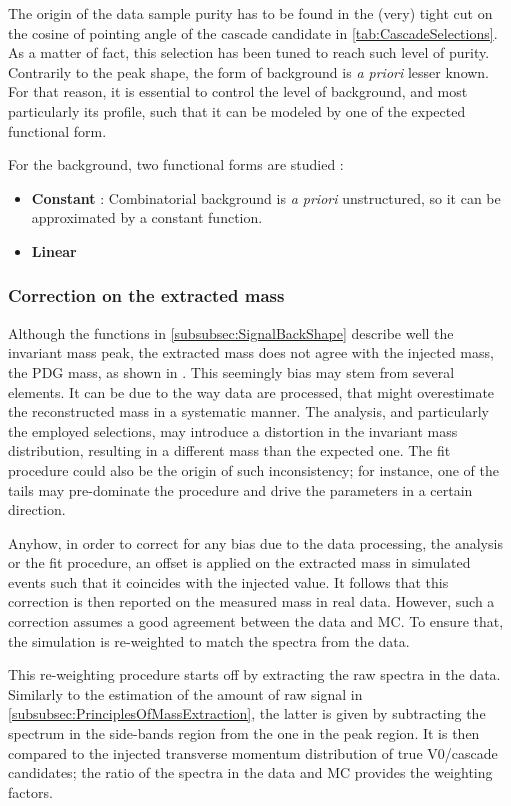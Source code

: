 The origin of the data sample purity has to be found in the (very) tight cut on the cosine of pointing angle of the cascade candidate in \tab\ref{tab:CascadeSelections}. As a matter of fact, this selection has been tuned to reach such level of purity. Contrarily to the peak shape, the form of background is \textit{a priori} lesser known. For that reason, it is essential to control the level of background, and most particularly its profile, such that it can be modeled by one of the expected functional form.


For the background, two functional forms are studied :

\begin{itemize}
\item \textbf{Constant} : Combinatorial background is \textit{a priori} unstructured, so it can be approximated by a constant function.
\item \textbf{Linear} 
\end{itemize}

\subsubsection{Correction on the extracted mass}

Although the functions in \Sec\ref{subsubsec:SignalBackShape} describe well the invariant mass peak, the extracted mass does not agree with the injected mass, the PDG mass, as shown in \fig. This seemingly bias may stem from several elements. It can be due to the way data are processed, that might overestimate the reconstructed mass in a systematic manner. The analysis, and particularly the employed selections, may introduce a distortion in the invariant mass distribution, resulting in a different mass than the expected one. The fit procedure could also be the origin of such inconsistency; for instance, one of the tails may pre-dominate the procedure and drive the parameters in a certain direction.

Anyhow, in order to correct for any bias due to the data processing, the analysis or the fit procedure, an offset is applied on the extracted mass in simulated events such that it coincides with the injected value. It follows that this correction is then reported on the measured mass in real data. However, such a correction assumes a good agreement between the data and MC. To ensure that, the simulation is re-weighted to match the \pT spectra from the data.

This re-weighting procedure starts off by extracting the raw \pT spectra in the data. Similarly to the estimation of the amount of raw signal in \Sec\ref{subsubsec:PrinciplesOfMassExtraction}, the latter is given by subtracting the \pT spectrum in the side-bands region from the one in the peak region. It is then compared to the injected transverse momentum distribution of true V0/cascade candidates; the ratio of the \pT spectra in the data and MC provides the weighting factors.


